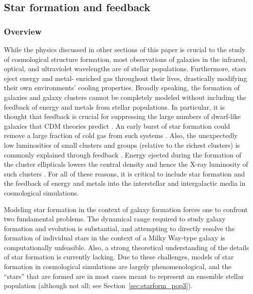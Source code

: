 \subsection{Star formation and feedback}
\label{sec.ov.star}


\subsubsection{Overview}

While the physics discussed in other sections of this paper is crucial
to the study of cosmological structure formation, most observations of
galaxies in the infrared, optical, and ultraviolet wavelengths are of
stellar populations.  Furthermore, stars eject energy and metal-
enriched gas throughout their lives, drastically modifying their own
environments' cooling properties.  Broadly speaking, the formation of
galaxies and galaxy clusters cannot be completely modeled without
including the feedback of energy and metals from stellar populations.
In particular, it is thought that feedback is crucial for suppressing
the large numbers of dwarf-like galaxies that CDM theories predict
\citep{1991ApJ...381...14L,1991ApJ...379...52W}.  An early burst of
star formation could remove a large fraction of cold gas from such
systems \citep{1978MNRAS.183..341W,1991ApJ...367...45C}.  Also, the
unexpectedly low luminosities of small clusters and groups (relative
to the richest clusters) is commonly explained through feedback
\citep{1991ApJ...383..104K}.  Energy ejected during the formation of
the cluster ellipticals lowers the central density and hence the X-ray
luminosity of such clusters \citep{1997ApJ...484L..21C}.  For all of
these reasons, it is critical to include star formation and the
feedback of energy and metals into the interstellar and intergalactic
media in cosmological simulations.

Modeling star formation in the context of galaxy formation forces one
to confront two fundamental problems. The dynamical range required to
study galaxy formation and evolution is substantial, and attempting to
directly resolve the formation of individual stars in the context of a
Milky Way-type galaxy is computationally unfeasible.  Also, a strong
theoretical understanding of the details of star formation is
currently lacking.  Due to these challenges, models of star formation
in cosmological simulations are largely phenomenological, and the
``stars'' that are formed are in most cases meant to represent an
ensemble stellar population (although not all; see
Section~\ref{sec:starform_pop3}). 

